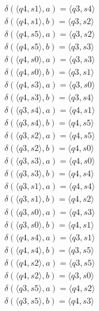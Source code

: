 \documentclass[fleqn]{article}
\begin{document}
\begin {equation*}
\begin {aligned}
\delta (\langle q4,s1 \rangle, a) = \langle q3,s4 \rangle \\
\delta (\langle q4,s1 \rangle, b) = \langle q3,s2 \rangle \\
\delta (\langle q4,s5 \rangle, a) = \langle q3,s2 \rangle \\
\delta (\langle q4,s5 \rangle, b) = \langle q3,s3 \rangle \\
\delta (\langle q4,s0 \rangle, a) = \langle q3,s3 \rangle \\
\delta (\langle q4,s0 \rangle, b) = \langle q3,s1 \rangle \\
\delta (\langle q4,s3 \rangle, a) = \langle q3,s0 \rangle \\
\delta (\langle q4,s3 \rangle, b) = \langle q3,s4 \rangle \\
\delta (\langle q3,s4 \rangle, a) = \langle q4,s1 \rangle \\
\delta (\langle q3,s4 \rangle, b) = \langle q4,s5 \rangle \\
\delta (\langle q3,s2 \rangle, a) = \langle q4,s5 \rangle \\
\delta (\langle q3,s2 \rangle, b) = \langle q4,s0 \rangle \\
\delta (\langle q3,s3 \rangle, a) = \langle q4,s0 \rangle \\
\delta (\langle q3,s3 \rangle, b) = \langle q4,s4 \rangle \\
\delta (\langle q3,s1 \rangle, a) = \langle q4,s4 \rangle \\
\delta (\langle q3,s1 \rangle, b) = \langle q4,s2 \rangle \\
\delta (\langle q3,s0 \rangle, a) = \langle q4,s3 \rangle \\
\delta (\langle q3,s0 \rangle, b) = \langle q4,s1 \rangle \\
\delta (\langle q4,s4 \rangle, a) = \langle q3,s1 \rangle \\
\delta (\langle q4,s4 \rangle, b) = \langle q3,s5 \rangle \\
\delta (\langle q4,s2 \rangle, a) = \langle q3,s5 \rangle \\
\delta (\langle q4,s2 \rangle, b) = \langle q3,s0 \rangle \\
\delta (\langle q3,s5 \rangle, a) = \langle q4,s2 \rangle \\
\delta (\langle q3,s5 \rangle, b) = \langle q4,s3 \rangle \\
\end {aligned}
\end {equation*}
\end{document}
